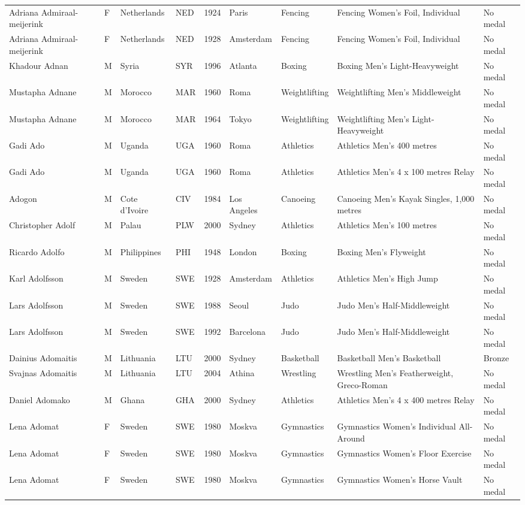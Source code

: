 \documentclass{article}%
\begin{document}
\begin{longtable}{p{1.5cm} p{0.5cm} p{2cm} p{1cm} p{1cm} p{1.5cm} p{1.5cm} p{5cm} p{1.5cm}}
Adriana Admiraal{-}meijerink&F&Netherlands&NED&1924&Paris&Fencing&Fencing Women's Foil, Individual&No medal\\%
Adriana Admiraal{-}meijerink&F&Netherlands&NED&1928&Amsterdam&Fencing&Fencing Women's Foil, Individual&No medal\\%
Khadour Adnan&M&Syria&SYR&1996&Atlanta&Boxing&Boxing Men's Light{-}Heavyweight&No medal\\%
Mustapha Adnane&M&Morocco&MAR&1960&Roma&Weightlifting&Weightlifting Men's Middleweight&No medal\\%
Mustapha Adnane&M&Morocco&MAR&1964&Tokyo&Weightlifting&Weightlifting Men's Light{-}Heavyweight&No medal\\%
Gadi Ado&M&Uganda&UGA&1960&Roma&Athletics&Athletics Men's 400 metres&No medal\\%
Gadi Ado&M&Uganda&UGA&1960&Roma&Athletics&Athletics Men's 4 x 100 metres Relay&No medal\\%
Adogon&M&Cote d'Ivoire&CIV&1984&Los Angeles&Canoeing&Canoeing Men's Kayak Singles, 1,000 metres&No medal\\%
Christopher Adolf&M&Palau&PLW&2000&Sydney&Athletics&Athletics Men's 100 metres&No medal\\%
Ricardo Adolfo&M&Philippines&PHI&1948&London&Boxing&Boxing Men's Flyweight&No medal\\%
Karl Adolfsson&M&Sweden&SWE&1928&Amsterdam&Athletics&Athletics Men's High Jump&No medal\\%
Lars Adolfsson&M&Sweden&SWE&1988&Seoul&Judo&Judo Men's Half{-}Middleweight&No medal\\%
Lars Adolfsson&M&Sweden&SWE&1992&Barcelona&Judo&Judo Men's Half{-}Middleweight&No medal\\%
Dainius Adomaitis&M&Lithuania&LTU&2000&Sydney&Basketball&Basketball Men's Basketball&Bronze\\%
Svajnas Adomaitis&M&Lithuania&LTU&2004&Athina&Wrestling&Wrestling Men's Featherweight, Greco{-}Roman&No medal\\%
Daniel Adomako&M&Ghana&GHA&2000&Sydney&Athletics&Athletics Men's 4 x 400 metres Relay&No medal\\%
Lena Adomat&F&Sweden&SWE&1980&Moskva&Gymnastics&Gymnastics Women's Individual All{-}Around&No medal\\%
Lena Adomat&F&Sweden&SWE&1980&Moskva&Gymnastics&Gymnastics Women's Floor Exercise&No medal\\%
Lena Adomat&F&Sweden&SWE&1980&Moskva&Gymnastics&Gymnastics Women's Horse Vault&No medal\\%

\end{longtable}
\end{document}
